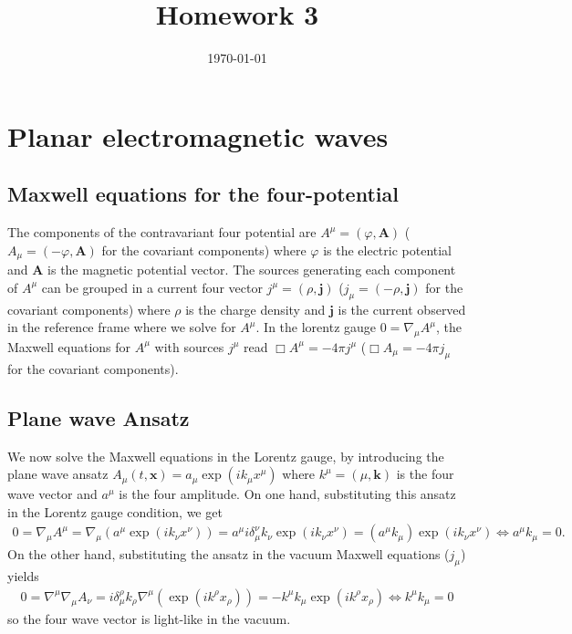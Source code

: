 \documentclass[10pt, a4paper]{article}
\title{Homework 3} %
\author{\PA} %
\date{\today} %
\begin{document}
\maketitlepage

\maketableofcontents

\footnotesize{
\section{Planar electromagnetic waves}
\subsection{Maxwell equations for the four-potential}
The components of the contravariant four potential are $A^{\mu} = (\varphi, \mathbf{A})$ ($A_{\mu} = (-\varphi, \mathbf{A})$ for the covariant components) where $\varphi$ is the electric potential and $\mathbf{A}$ is the magnetic potential vector. The sources generating each component of $A^{\mu}$ can be grouped in a current four vector $j^{\mu}=(\rho, \mathbf{j})$ ($j_{\mu} = (-\rho, \mathbf{j})$ for the covariant components) where $\rho$ is the charge density and  $\mathbf{j}$  is the current observed in the reference frame where we solve for $A^{\mu}$. In the lorentz gauge $0=\nabla_{\mu} A^{\mu}$, the Maxwell equations for $A^{\mu}$ with sources $j^{\mu}$ read $\Box A^{\mu} = -4\pi j^{\mu}$ ($\Box A_{\mu} = -4\pi j_{\mu}$ for the covariant components). 

\subsection{Plane wave Ansatz}
We now solve the Maxwell equations in the Lorentz gauge, by introducing the plane wave ansatz $A_\mu(t, \mathbf{x}) = a_\mu \exp \left(i k_\mu x^\mu\right)$ where $k^{\mu}= (\mu, \mathbf{k})$ is the four wave vector and $a^{\mu}$ is the four amplitude. On one hand, substituting this ansatz in the Lorentz gauge condition, we get 
\begin{align*}
    0 = \nabla_{\mu} A^{\mu} = \nabla_{\mu} \left(a^\mu \exp \left(i k_\nu x^\nu\right)\right) = a^\mu i\delta_\mu^\nu k_{\nu} \exp \left(i k_\nu x^\nu\right) = (a^{\mu} k_{\mu}) \exp \left(i k_\nu x^\nu\right) \iff  a^{\mu} k_{\mu} = 0.
\end{align*}
On the other hand, substituting the ansatz in the vacuum Maxwell equations ($ j_{\mu}$) yields 
\begin{align*}
    0 =  \nabla^{\mu}\nabla_{\mu} A_{\nu} =  i\delta_\mu^\rho k_{\rho} \nabla^{\mu} (\exp \left(i k^\rho x_\rho\right)) = -k^{\mu} k_{\mu} \exp \left(i k^\rho x_\rho\right) \iff k^{\mu} k_{\mu} = 0
\end{align*}
so the four wave vector is light-like in the vacuum. 

}
\end{document}
